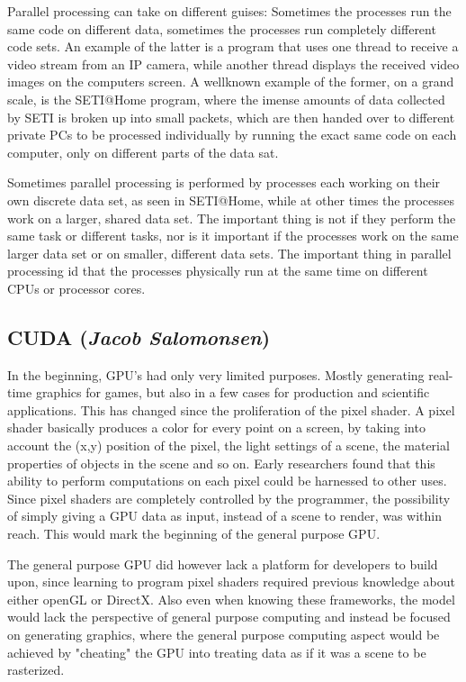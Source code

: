 Parallel processing can take on different guises: Sometimes the processes run the same code on different data, sometimes the processes run completely different code sets. An example of the latter is a program that uses one thread to receive a video stream from an IP camera, while another thread displays the received video images on the computers screen. A wellknown example of the former, on a grand scale, is the SETI@Home program, where the imense amounts of data collected by SETI is broken up into small packets, which are then handed over to different private PCs to be processed individually by running the exact same code on each computer, only on different parts of the data sat.

Sometimes parallel processing is performed by processes each working on their own discrete data set, as seen in SETI@Home, while at other times the processes work on a larger, shared data set. The important thing is not if they perform the same task or different tasks, nor is it important if the processes work on the same larger data set or on smaller, different data sets. The important thing in parallel processing id that the processes physically run at the same time on different CPUs or processor cores.

\subsection{CUDA (\textit{Jacob Salomonsen})}
In the beginning, GPU's had only very limited purposes. Mostly generating real-time graphics for games, but also in a few cases for production and scientific applications. This has changed since the proliferation of the pixel shader. A pixel shader basically produces a color for every point on a screen, by taking into account the (x,y) position of the pixel, the light settings of a scene, the material properties of objects in the scene and so on. Early researchers found that this ability to perform computations on each pixel could be harnessed to other uses. Since pixel shaders are completely controlled by the programmer, the possibility of simply giving a GPU data as input, instead of a scene to render, was within reach. This would mark the beginning of the general purpose GPU.

The general purpose GPU did however lack a platform for developers to build upon, since learning to program pixel shaders required previous knowledge about either openGL or DirectX. Also even when knowing these frameworks, the model would lack the perspective of general purpose computing and instead be focused on generating graphics, where the general purpose computing aspect would be achieved by "cheating" the GPU into treating data as if it was a scene to be rasterized.

